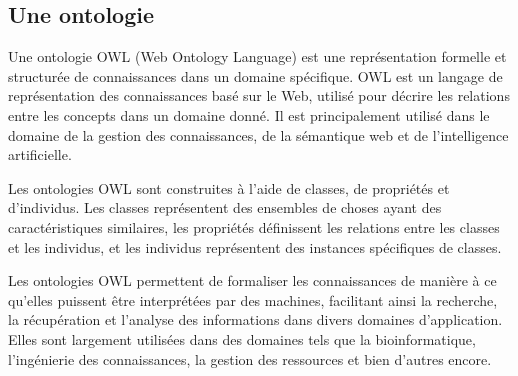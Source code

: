 \documentclass{article}
\begin{document}
	\subsection{Une ontologie}
	\quad Une ontologie OWL (Web Ontology Language) est une représentation formelle et structurée de connaissances dans un domaine spécifique. OWL est un langage de représentation des connaissances basé sur le Web, utilisé pour décrire les relations entre les concepts dans un domaine donné. Il est principalement utilisé dans le domaine de la gestion des connaissances, de la sémantique web et de l'intelligence artificielle.
	
	Les ontologies OWL sont construites à l'aide de classes, de propriétés et d'individus. Les classes représentent des ensembles de choses ayant des caractéristiques similaires, les propriétés définissent les relations entre les classes et les individus, et les individus représentent des instances spécifiques de classes.
	
	Les ontologies OWL permettent de formaliser les connaissances de manière à ce qu'elles puissent être interprétées par des machines, facilitant ainsi la recherche, la récupération et l'analyse des informations dans divers domaines d'application. Elles sont largement utilisées dans des domaines tels que la bioinformatique, l'ingénierie des connaissances, la gestion des ressources et bien d'autres encore.
	
\end{document}
